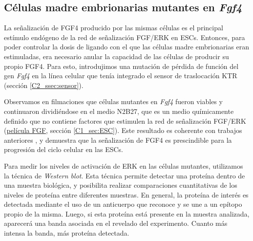 \documentclass[./main.tex]{subfiles}
\begin{document}
\subsection{Células madre embrionarias mutantes en \textit{Fgf4}}
\label{sec:c2_KO}


La señalización de FGF4 producido por las mismas células es el principal estímulo endógeno de la red de señalización FGF/ERK en ESCs. Entonces, para poder controlar la dosis de ligando con el que las células madre embrionarias eran estimuladas, era necesario anular la capacidad de las células de producir su propio FGF4. Para esto, introdujimos una mutación de pérdida de función del gen \textit{Fgf4} en la línea celular que tenía integrado el sensor de traslocación KTR (sección \ref{C2_ssec:sensor}). 


Observamos en filmaciones que células mutantes en \textit{Fgf4} fueron viables y continuaron dividiéndose en el medio N2B27, que es un medio químicamente definido que no contiene factores que estimulen la red de señalización FGF/ERK (\href{http://movie.biologists.com/video/10.1242/dev.199710/video-2}{\underline{película FGF}}, sección \ref{C1_sec:ESC}). Este resultado es coherente con trabajos anteriores \cite{Kunath2007}, y demuestra que la señalización de FGF4 es prescindible para la progresión del ciclo celular en las ESCs. 


Para medir los niveles de activación de ERK en las células mutantes, utilizamos la técnica de \textit{\textit{Western blot}}.
 Esta técnica permite detectar una proteína dentro de una muestra biológica, y posibilita realizar comparaciones cuantitativas de los niveles de proteína entre diferentes muestras. En general, la proteína de interés es detectada mediante el uso de un anticuerpo que reconoce y se une a un epítopo propio de la misma. Luego, si esta proteína está presente en la muestra analizada, aparecerá una banda asociada en el revelado del experimento. Cuanto más intensa la banda, más proteína detectada.  
\end{document}
